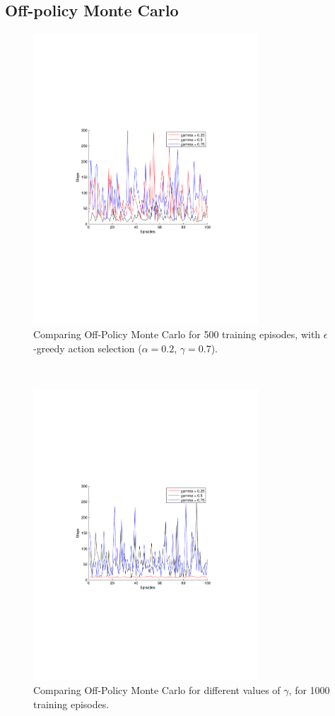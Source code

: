 \documentclass[a4paper,11pt]{article}
\begin{document}
\subsection*{Off-policy Monte Carlo}



\begin{figure}[h!]
  \centering
    \includegraphics[trim=4cm 8.5cm 4cm 8.5cm,clip,width=0.75\textwidth]{figures/offmc500.pdf}
    \caption{Comparing Off-Policy Monte Carlo for 500 training episodes, with $\epsilon$ -greedy action selection ($\alpha = 0.2$, $\gamma = 0.7$).}
\end{figure}
~
\begin{figure}[h!]
  \centering
    \includegraphics[trim=4cm 8.5cm 4cm 8.5cm,clip,width=0.75\textwidth]{figures/offmc1000.pdf}
    \caption{Comparing Off-Policy Monte Carlo for different values of $\gamma$, for 1000 training episodes.}
\end{figure}
\end{document}
